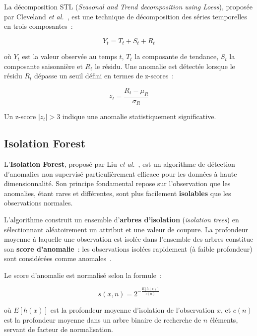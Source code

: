 La décomposition STL (\textit{Seasonal and Trend decomposition using Loess}), proposée par Cleveland \textit{et al.}~\cite{cleveland1990}, est une technique de décomposition des séries temporelles en trois composantes~:

\begin{equation}
Y_t = T_t + S_t + R_t
\end{equation}

\noindent où $Y_t$ est la valeur observée au temps $t$, $T_t$ la composante de tendance, $S_t$ la composante saisonnière et $R_t$ le résidu. Une anomalie est détectée lorsque le résidu $R_t$ dépasse un seuil défini en termes de z-scores~:

\begin{equation}
z_t = \frac{R_t - \mu_R}{\sigma_R}
\end{equation}

\noindent Un z-score $|z_t| > 3$ indique une anomalie statistiquement significative.

\subsection{Isolation Forest}

L'\textbf{Isolation Forest}, proposé par Liu \textit{et al.}~\cite{liu2008}, est un algorithme de détection d'anomalies non supervisé particulièrement efficace pour les données à haute dimensionnalité. Son principe fondamental repose sur l'observation que les anomalies, étant rares et différentes, sont plus facilement \textbf{isolables} que les observations normales.

L'algorithme construit un ensemble d'\textbf{arbres d'isolation} (\textit{isolation trees}) en sélectionnant aléatoirement un attribut et une valeur de coupure. La profondeur moyenne à laquelle une observation est isolée dans l'ensemble des arbres constitue son \textbf{score d'anomalie}~: les observations isolées rapidement (à faible profondeur) sont considérées comme anomales~\cite{liu2008}.

Le score d'anomalie est normalisé selon la formule~:

\begin{equation}
s(x, n) = 2^{-\frac{E[h(x)]}{c(n)}}
\end{equation}

\noindent où $E[h(x)]$ est la profondeur moyenne d'isolation de l'observation $x$, et $c(n)$ est la profondeur moyenne dans un arbre binaire de recherche de $n$ éléments, servant de facteur de normalisation.

